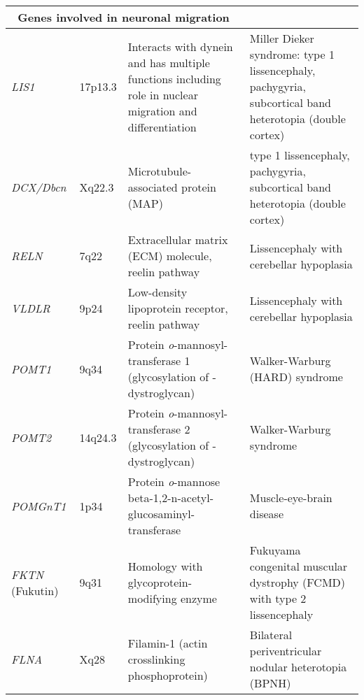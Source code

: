 {\begin{landscape}
\begin{spacing}{0.7}
\begin{longtable}{p{1in} p{1in} p{4.25in} p{2.75in}}
    \multicolumn{4}{l}{\bfseries~Genes involved in neuronal migration} \\ \midrule    
	\textit{LIS1} & 17p13.3 & Interacts with dynein and has multiple functions including role in nuclear migration and differentiation & Miller Dieker syndrome: type 1 lissencephaly, pachygyria, subcortical band heterotopia (double cortex) \\ \midrule
	\textit{DCX/Dbcn} & Xq22.3 & Microtubule-associated protein (MAP) & type 1 lissencephaly, pachygyria, subcortical band heterotopia (double cortex) \\ \midrule
	\textit{RELN} & 7q22 & Extracellular matrix (ECM) molecule, reelin pathway & Lissencephaly with cerebellar hypoplasia \\ \midrule
	\textit{VLDLR} & 9p24 & Low-density lipoprotein receptor, reelin pathway & Lissencephaly with cerebellar hypoplasia \\ \midrule
	\textit{POMT1} & 9q34 & Protein \textit{o}-mannosyl-transferase 1 (glycosylation of \alpha-dystroglycan) & Walker-Warburg (HARD) syndrome \\ \midrule
	\textit{POMT2} & 14q24.3 & Protein \textit{o}-mannosyl-transferase 2 (glycosylation of \alpha-dystroglycan) & Walker-Warburg syndrome \\ \midrule
	\textit{POMGnT1} & 1p34 & Protein \textit{o}-mannose beta-1,2-n-acetyl-glucosaminyl-transferase & Muscle-eye-brain disease \\ \midrule
	\textit{FKTN} (Fukutin) & 9q31 & Homology with glycoprotein-modifying enzyme & Fukuyama congenital muscular dystrophy (FCMD) with type 2 lissencephaly \\ \midrule
	\textit{FLNA} & Xq28 & Filamin-1 (actin crosslinking phosphoprotein) & Bilateral periventricular nodular heterotopia (BPNH) \\ \midrule
  	

\end{longtable}
\end{spacing}
\end{landscape}}
